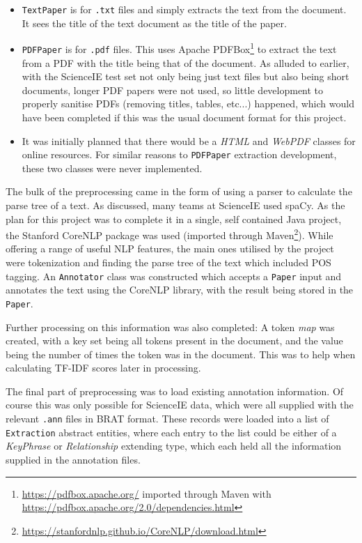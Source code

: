 \begin{itemize}
	\item \texttt{TextPaper} is for \texttt{.txt} files and simply extracts the text from the document. It sees the title of the text document as the title of the paper.
	\item \texttt{PDFPaper} is for \texttt{.pdf} files. This uses Apache PDFBox\footnote{\href{https://pdfbox.apache.org/}{https://pdfbox.apache.org/} imported through Maven with \href{https://pdfbox.apache.org/2.0/dependencies.html}{https://pdfbox.apache.org/2.0/dependencies.html}} to extract the text from a PDF with the title being that of the document. As alluded to earlier, with the ScienceIE test set not only being just text files but also being short documents, longer PDF papers were not used, so little development to properly sanitise PDFs (removing titles, tables, etc...) happened, which would have been completed if this was the usual document format for this project.
	\item It was initially planned that there would be a \textit{HTML} and \textit{WebPDF} classes for online resources. For similar reasons to \texttt{PDFPaper} extraction development, these two classes were never implemented. 
\end{itemize}

The bulk of the preprocessing came in the form of using a parser to calculate the parse tree of a text. As discussed, many teams at ScienceIE used spaCy. As the plan for this project was to complete it in a single, self contained Java project, the Stanford CoreNLP package was used \cite{Manning2014} (imported through Maven\footnote{\href{https://stanfordnlp.github.io/CoreNLP/download.html}{https://stanfordnlp.github.io/CoreNLP/download.html}}). While offering a range of useful NLP features, the main ones utilised by the project were tokenization and finding the parse tree of the text which included POS tagging. An \texttt{Annotator} class was constructed which accepts a \texttt{Paper} input and annotates the text using the CoreNLP library, with the result being stored in the \texttt{Paper}.

Further processing on this information was also completed: A token \textit{map} was created, with a key set being all tokens present in the document, and the value being the number of times the token was in the document. This was to help when calculating TF-IDF scores later in processing.

The final part of preprocessing was to load existing annotation information. Of course this was only possible for ScienceIE data, which were all supplied with the relevant \texttt{.ann} files in BRAT format. These records were loaded into a list of \texttt{Extraction} abstract entities, where each entry to the list could be either of a \textit{KeyPhrase} or \textit{Relationship} extending type, which each held all the information supplied in the annotation files.


